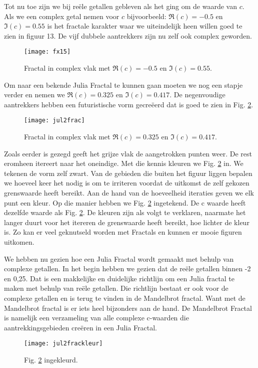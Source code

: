 \documentclass[11pt,fleqn]{book} %
\begin{document}
Tot nu toe zijn we bij reële getallen gebleven als het ging om de waarde van $c$. Als we een complex getal nemen voor $c$ bijvoorbeeld: $\Re(c) = - 0.5$ en $\Im(c) = 0.55$ is het fractale karakter waar we uiteindelijk heen willen goed te zien in figuur 13. De vijf dubbele aantrekkers zijn nu zelf ook complex geworden. 
\begin{figure}[h]
	\centering\texttt{[image: fx15]}
	\caption{Fractal in complex vlak met $\Re(c) = - 0.5$ en $\Im(c) = 0.55$.}
	\label{fig:fx15}
\end{figure}
Om naar een bekende Julia Fractal te kunnen gaan moeten we nog een stapje verder en nemen we $\Re(c) = 0.325$ en $\Im(c) = 0.417$. De negenvoudige aantrekkers hebben een futuristische vorm gecreëerd dat is goed te zien in Fig. \ref{fig:jul2frac}.
\begin{figure}[h]
	\centering\texttt{[image: jul2frac]}
	\caption{Fractal in complex vlak met $\Re(c) = 0.325$ en $\Im(c) = 0.417$.}
	\label{fig:jul2frac}
\end{figure}

Zoals eerder is gezegd geeft het grijze vlak de aangetrokken punten weer. De rest eromheen itereert naar het oneindige. Met die kennis kleuren we Fig. \ref{fig:jul2frac} in. We tekenen de vorm zelf zwart. Van de gebieden die buiten het figuur liggen bepalen we hoeveel keer het nodig is om te irriteren voordat de uitkomst de zelf gekozen grenswaarde heeft bereikt. Aan de hand van de hoeveelheid iteraties geven we elk punt een kleur. Op die manier hebben we Fig. \ref{fig:jul2frac} ingetekend. De c waarde heeft dezelfde waarde als Fig. \ref{fig:jul2frac}. De kleuren zijn als volgt te verklaren, naarmate het langer duurt voor het itereren de grenswaarde heeft bereikt, hoe lichter de kleur is. Zo kan er veel geknutseld worden met Fractals en kunnen er mooie figuren uitkomen.

We hebben nu gezien hoe een Julia Fractal wordt gemaakt met behulp van complexe getallen. In het begin hebben we gezien dat de reële getallen binnen -2 en 0,25. Dat is een makkelijke en duidelijke richtlijn om een Julia fractal te maken met behulp van reële getallen. Die richtlijn bestaat er ook voor de complexe getallen en is terug te vinden in de Mandelbrot fractal.
Want met de Mandelbrot fractal is er iets heel bijzonders aan de hand. De Mandelbrot Fractal is namelijk een verzameling van alle complexe c-waarden die aantrekkingsgebieden creëren in een Julia Fractal.
\begin{figure}[h]
	\centering\texttt{[image: jul2frackleur]}
	\caption{Fig. \ref{fig:jul2frac} ingekleurd.}
	\label{fig:jul2frackleur}
\end{figure}
\end{document}
